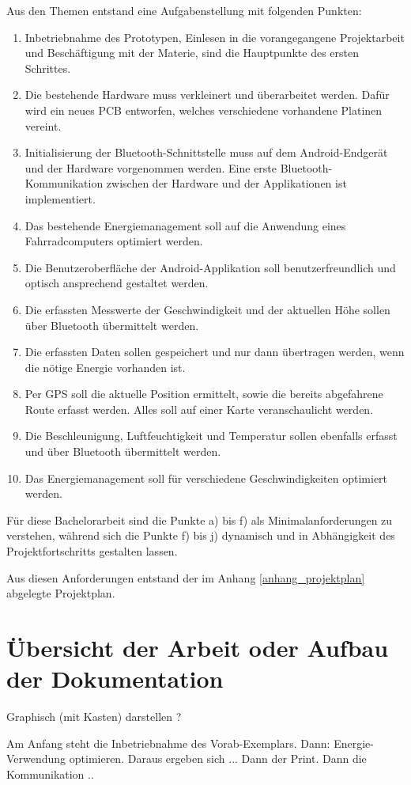 Aus den Themen entstand eine Aufgabenstellung mit folgenden Punkten:


\begin{enumerate} 

\item Inbetriebnahme des Prototypen, Einlesen in die vorangegangene Projektarbeit und Beschäftigung mit der Materie, sind die Hauptpunkte des ersten Schrittes.

\item Die bestehende Hardware muss verkleinert und überarbeitet werden. Dafür wird ein neues PCB entworfen, welches verschiedene vorhandene Platinen vereint.

\item Initialisierung der Bluetooth-Schnittstelle muss auf dem Android-Endgerät und der Hardware vorgenommen werden. Eine erste Bluetooth-Kommunikation zwischen der Hardware und der Applikationen ist implementiert.

\item Das bestehende Energiemanagement soll auf die Anwendung eines Fahrradcomputers optimiert werden.

\item Die Benutzeroberfläche der Android-Applikation soll benutzerfreundlich und optisch ansprechend gestaltet werden.

\item Die erfassten Messwerte der Geschwindigkeit und der aktuellen Höhe sollen über Bluetooth übermittelt werden.

\item	Die erfassten Daten sollen gespeichert und nur dann übertragen werden, wenn die nötige Energie vorhanden ist.

\item	Per GPS soll die aktuelle Position ermittelt, sowie die bereits abgefahrene Route erfasst werden. Alles soll auf einer Karte veranschaulicht werden.

\item	Die Beschleunigung, Luftfeuchtigkeit und Temperatur sollen ebenfalls erfasst und über Bluetooth übermittelt werden.


\item	Das Energiemanagement soll für verschiedene Geschwindigkeiten optimiert werden.
\end{enumerate}

Für diese Bachelorarbeit sind die Punkte a) bis f) als Minimalanforderungen zu verstehen, während sich die Punkte f) bis j) dynamisch und in Abhängigkeit des Projektfortschritts gestalten lassen.


Aus diesen Anforderungen entstand der im Anhang \ref{anhang_projektplan} abgelegte Projektplan. 






\section{Übersicht der Arbeit  oder Aufbau der Dokumentation}
Graphisch (mit Kasten) darstellen ?

Am Anfang steht die Inbetriebnahme des Vorab-Exemplars. 
Dann: Energie-Verwendung optimieren.
Daraus ergeben sich ...
Dann der Print.
Dann die Kommunikation
..
